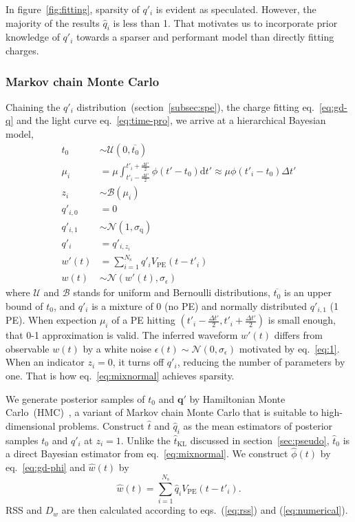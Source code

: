 In figure~\ref{fig:fitting}, sparsity of $q'_i$ is evident as speculated.  However, the majority of the results $\hat{q}_i$ is less than 1.  That motivates us to incorporate prior knowledge of $q'_i$ towards a sparser and performant model than directly fitting charges.


\subsubsection{Markov chain Monte Carlo}
\label{subsec:mcmc}
Chaining the $q'_i$ distribution~(section~\ref{subsec:spe}), the charge fitting eq.~\eqref{eq:gd-q} and the light curve eq.~\eqref{eq:time-pro}, we arrive at a hierarchical Bayesian model,
\begin{equation}
  \begin{aligned}
    t_{0} &\sim \mathcal{U}(0, \overline{t_0}) \\
    \mu_i &= \mu \int_{t'_i-\frac{\Delta t'}{2}}^{t'_i+\frac{\Delta t'}{2}} \phi(t' - t_0)\mathrm{d}t' \approx \mu\phi(t'_i - t_0)\Delta{t'} \\
    z_i &\sim \mathcal{B}(\mu_i) \\
    q'_{i,0}&=0\\
    q'_{i,1}& \sim \mathcal{N}(1, \sigma_\mathrm{q})\\
    q'_i &= q'_{i,z_i}\\
    w'(t) & = \sum_{i=1}^{N_\mathrm{s}}q'_iV_\mathrm{PE}(t-t'_i)\\
    w(t) &\sim \mathcal{N}(w'(t), \sigma_\epsilon)
  \end{aligned}
  \label{eq:mixnormal}
\end{equation}
where $\mathcal{U}$ and $\mathcal{B}$ stands for uniform and Bernoulli distributions, $\overline{t_0}$ is an upper bound of $t_0$, and $q'_i$ is a mixture of 0 (no PE) and normally distributed $q'_{i,1}$ (1 PE). When expection $\mu_i$ of a PE hitting $(t'_{i} - \frac{\Delta t'}{2}, t'_{i} + \frac{\Delta t'}{2})$ is small enough, that 0-1 approximation is valid.  The inferred waveform $w'(t)$ differs from observable $w(t)$ by a white noise $\epsilon(t) \sim \mathcal{N}(0, \sigma_\epsilon)$ motivated by eq.~\eqref{eq:1}.  When an indicator $z_i=0$, it turns off $q'_i$, reducing the number of parameters by one.  That is how eq.~\eqref{eq:mixnormal} achieves sparsity.

We generate posterior samples of $t_0$ and $\bm{q'}$ by Hamiltonian Monte Carlo~(HMC)~\cite{neal_mcmc_2012}, a variant of Markov chain Monte Carlo that is suitable to high-dimensional problems. Construct $\hat{t}$ and $\hat{q}_i$ as the mean estimators of posterior samples $t_0$ and $q'_i$ at $z_i=1$.  Unlike the $\hat{t}_\mathrm{KL}$ discussed in section~\ref{sec:pseudo}, $\hat{t}_0$ is a direct Bayesian estimator from eq.~\eqref{eq:mixnormal}.  We construct $\hat{\phi}(t)$ by eq.~\eqref{eq:gd-phi} and $\hat{w}(t)$ by
\begin{equation}
  \label{eq:mcmc-w}
  \hat{w}(t) = \sum_{i=1}^{N_\mathrm{s}}\hat{q}_iV_\mathrm{PE}(t-t'_i).
\end{equation}
RSS and $D_w$ are then calculated according to eqs.~(\ref{eq:rss}) and (\ref{eq:numerical}).


